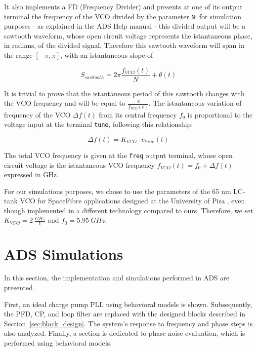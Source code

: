 \documentclass[lettersize,journal]{IEEEtran}
\begin{document}
It also implements a FD (Frequency Divider) and presents at one of its output terminal the frequency of the VCO divided by the parameter \texttt{N}: for simulation purposes - as explained in the ADS Help manual - this divided output will be a sawtooth waveform, whose open circuit voltage represents the istantaneous phase, in radians, of the divided signal. Therefore this sawtooth waveform will span in the range \(\left[-\pi,\pi\right]\), with an istantaneous slope of

\begin{equation}\label{eq:sawtooth_slope}
    S_{sawtooth}=2\pi \frac{f_{VCO}(t)}{N}+\theta(t)
\end{equation}

It is trivial to prove that the istantaneous period of this sawtooth changes with the VCO frequency and will be equal to \(\frac{N}{f_{VCO}(t)}\). The istantaneous variation of frequency of the VCO \(\Delta f(t)\) from its central frequency \(f_0\) is proportional to the voltage input at the terminal \texttt{tune}, following this relationship:

\begin{equation}\label{eq:vco_freq}
    \Delta f(t) = K_{VCO}\cdot v_{tune}(t)
\end{equation}

The total VCO frequency is given at the \texttt{freq} output terminal, whose open circuit voltage is the istantaneous VCO frequency \(f_{VCO}(t)=f_0+\Delta f(t)\) expressed in GHz.

For our simulations purposes, we chose to use the parameters of the 65 nm LC-tank VCO for SpaceFibre applications designed at the University of Pisa \cite{vco}, even though implemented in a different technology compared to ours. Therefore, we set \(K_{VCO}=2\ \frac{GHz}{V}\) and \(f_0=5.95\ GHz\).



\section{ADS Simulations}
\label{sec:ADS_simulations}
In this section, the implementation and simulations performed in ADS are presented. 

First, an ideal charge pump PLL using behavioral models is shown. Subsequently, the PFD, CP, and loop filter are replaced with the designed blocks described in Section~\ref{sec:block_design}. The system's response to frequency and phase steps is also analyzed. Finally, a section is dedicated to phase noise evaluation, which is performed using behavioral models.
\end{document}

